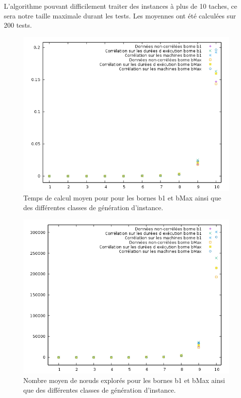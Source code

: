 \documentclass[12pt]{article}
\begin{document}
L'algorithme pouvant difficilement traiter des instances à plus de 10 taches, ce sera notre taille maximale durant les tests. Les moyennes ont été calculées sur 200 tests.

\begin{figure}[!ht]
\centering
\centerline{\includegraphics[scale=0.9]{tempsmoyen.png}}
\caption{Temps de calcul moyen pour pour les bornes b1 et bMax ainsi que des différentes classes de génération d'instance.}
\label{tmpmoy}
\end{figure}

\begin{figure}[!ht]
\centering
\centerline{\includegraphics[scale=0.9]{nodemoyen.png}}
\caption{Nombre moyen de nœuds explorés pour les bornes b1 et bMax ainsi que des différentes classes de génération d'instance.}
\label{ndmoy}
\end{figure}
\end{document}
